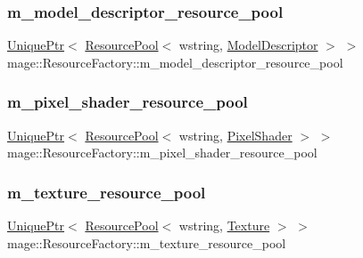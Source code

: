 \subsubsection{\texorpdfstring{m\+\_\+model\+\_\+descriptor\+\_\+resource\+\_\+pool}{m\_model\_descriptor\_resource\_pool}}
{\footnotesize\ttfamily \hyperlink{namespacemage_a8c307fbcc33bce9b7f2aa4c26c3b95cf}{Unique\+Ptr}$<$ \hyperlink{classmage_1_1_resource_pool}{Resource\+Pool}$<$ wstring, \hyperlink{classmage_1_1_model_descriptor}{Model\+Descriptor} $>$ $>$ mage\+::\+Resource\+Factory\+::m\+\_\+model\+\_\+descriptor\+\_\+resource\+\_\+pool\hspace{0.3cm}{\ttfamily [private]}}

\hypertarget{classmage_1_1_resource_factory_a987af631d0fda02fd336ceb02113a128}{}\label{classmage_1_1_resource_factory_a987af631d0fda02fd336ceb02113a128} 
\subsubsection{\texorpdfstring{m\+\_\+pixel\+\_\+shader\+\_\+resource\+\_\+pool}{m\_pixel\_shader\_resource\_pool}}
{\footnotesize\ttfamily \hyperlink{namespacemage_a8c307fbcc33bce9b7f2aa4c26c3b95cf}{Unique\+Ptr}$<$ \hyperlink{classmage_1_1_resource_pool}{Resource\+Pool}$<$ wstring, \hyperlink{classmage_1_1_pixel_shader}{Pixel\+Shader} $>$ $>$ mage\+::\+Resource\+Factory\+::m\+\_\+pixel\+\_\+shader\+\_\+resource\+\_\+pool\hspace{0.3cm}{\ttfamily [private]}}

\hypertarget{classmage_1_1_resource_factory_a0bb6251c64ac1f5e9de04968f9d78e57}{}\label{classmage_1_1_resource_factory_a0bb6251c64ac1f5e9de04968f9d78e57} 
\subsubsection{\texorpdfstring{m\+\_\+texture\+\_\+resource\+\_\+pool}{m\_texture\_resource\_pool}}
{\footnotesize\ttfamily \hyperlink{namespacemage_a8c307fbcc33bce9b7f2aa4c26c3b95cf}{Unique\+Ptr}$<$ \hyperlink{classmage_1_1_resource_pool}{Resource\+Pool}$<$ wstring, \hyperlink{classmage_1_1_texture}{Texture} $>$ $>$ mage\+::\+Resource\+Factory\+::m\+\_\+texture\+\_\+resource\+\_\+pool\hspace{0.3cm}{\ttfamily [private]}}

